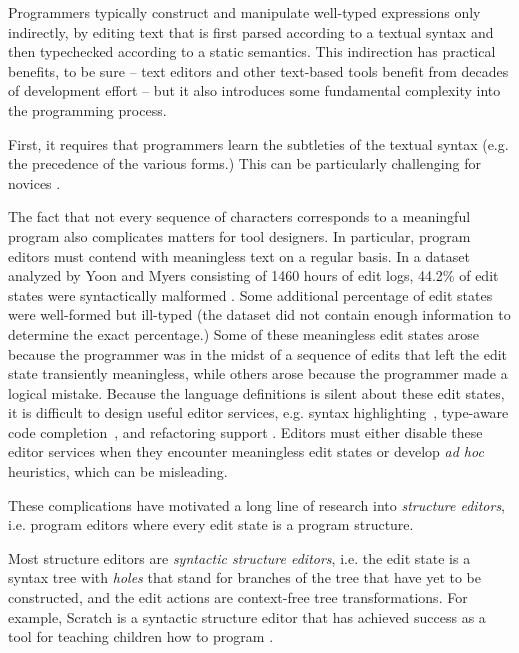 
Programmers typically construct and manipulate well-typed expressions only
indirectly, by editing text that is first parsed according to a textual
syntax and then typechecked according to a static semantics. This
indirection has practical benefits, to be sure -- text editors and other
text-based tools benefit from decades of development effort -- but it also
introduces some fundamental complexity into the programming process.

First, it requires that programmers learn the subtleties of the textual
syntax (e.g. the precedence of the various forms.) This can be particularly
challenging for novices \cite{Altadmri:2015:MCI:2676723.2677258}.


The fact that not every sequence of characters corresponds to a meaningful program also complicates matters for tool designers. In particular, program editors must contend with meaningless text on a regular basis. In a dataset analyzed by Yoon and Myers consisting of 1460 hours of edit logs, 44.2\% of edit states were syntactically malformed \cite{6883030}. Some additional percentage of edit states were well-formed but ill-typed (the dataset did not contain enough information to determine the exact percentage.)
Some of these meaningless edit states arose because the programmer was in the midst of a sequence of edits that left the edit state transiently meaningless, while others arose because the programmer made a logical mistake. Because the language definitions is silent about these edit states, it is difficult to design useful editor services, e.g. syntax highlighting~\cite{sarkar2015impact}, type-aware code completion~\cite{Mooty:2010:CCC:1915084.1916348,Omar:2012:ACC:2337223.2337324}, and refactoring support \cite{mens2004survey}. Editors must either disable these editor services when they encounter meaningless edit states or develop \emph{ad hoc} heuristics, which can be misleading. %

These complications have motivated a long line of research into \emph{structure editors}, i.e. program editors where every edit state is a program structure. %

Most structure editors are \emph{syntactic structure editors}, i.e. the edit state is a syntax tree with \emph{holes} that stand for branches of the tree that have yet to be constructed, and the edit actions are context-free tree transformations. For example, Scratch is a syntactic structure editor that has achieved success as a tool for teaching children how to program \cite{Resnick:2009:SP:1592761.1592779}.

